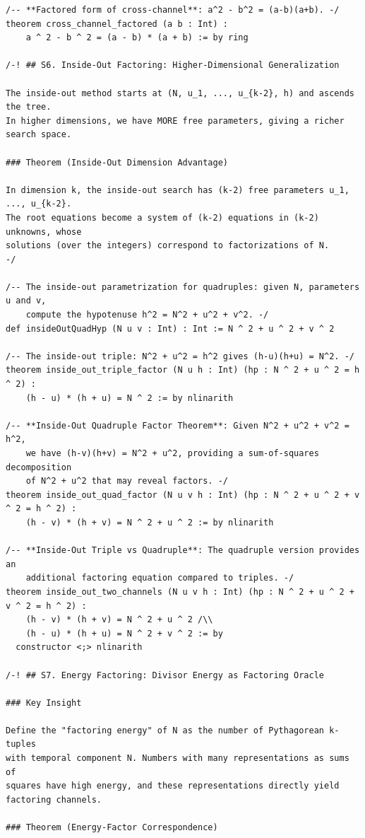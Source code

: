 \documentclass[11pt,openright,twoside]{book}
\theoremstyle{definition}
\begin{document}
\begin{lstlisting}[style=lean]
/-- **Factored form of cross-channel**: a^2 - b^2 = (a-b)(a+b). -/
theorem cross_channel_factored (a b : Int) :
    a ^ 2 - b ^ 2 = (a - b) * (a + b) := by ring

/-! ## S6. Inside-Out Factoring: Higher-Dimensional Generalization

The inside-out method starts at (N, u_1, ..., u_{k-2}, h) and ascends the tree.
In higher dimensions, we have MORE free parameters, giving a richer search space.

### Theorem (Inside-Out Dimension Advantage)

In dimension k, the inside-out search has (k-2) free parameters u_1, ..., u_{k-2}.
The root equations become a system of (k-2) equations in (k-2) unknowns, whose
solutions (over the integers) correspond to factorizations of N.
-/

/-- The inside-out parametrization for quadruples: given N, parameters u and v,
    compute the hypotenuse h^2 = N^2 + u^2 + v^2. -/
def insideOutQuadHyp (N u v : Int) : Int := N ^ 2 + u ^ 2 + v ^ 2

/-- The inside-out triple: N^2 + u^2 = h^2 gives (h-u)(h+u) = N^2. -/
theorem inside_out_triple_factor (N u h : Int) (hp : N ^ 2 + u ^ 2 = h ^ 2) :
    (h - u) * (h + u) = N ^ 2 := by nlinarith

/-- **Inside-Out Quadruple Factor Theorem**: Given N^2 + u^2 + v^2 = h^2,
    we have (h-v)(h+v) = N^2 + u^2, providing a sum-of-squares decomposition
    of N^2 + u^2 that may reveal factors. -/
theorem inside_out_quad_factor (N u v h : Int) (hp : N ^ 2 + u ^ 2 + v ^ 2 = h ^ 2) :
    (h - v) * (h + v) = N ^ 2 + u ^ 2 := by nlinarith

/-- **Inside-Out Triple vs Quadruple**: The quadruple version provides an
    additional factoring equation compared to triples. -/
theorem inside_out_two_channels (N u v h : Int) (hp : N ^ 2 + u ^ 2 + v ^ 2 = h ^ 2) :
    (h - v) * (h + v) = N ^ 2 + u ^ 2 /\\
    (h - u) * (h + u) = N ^ 2 + v ^ 2 := by
  constructor <;> nlinarith

/-! ## S7. Energy Factoring: Divisor Energy as Factoring Oracle

### Key Insight

Define the "factoring energy" of N as the number of Pythagorean k-tuples
with temporal component N. Numbers with many representations as sums of
squares have high energy, and these representations directly yield
factoring channels.

### Theorem (Energy-Factor Correspondence)


\end{lstlisting}
\end{document}
